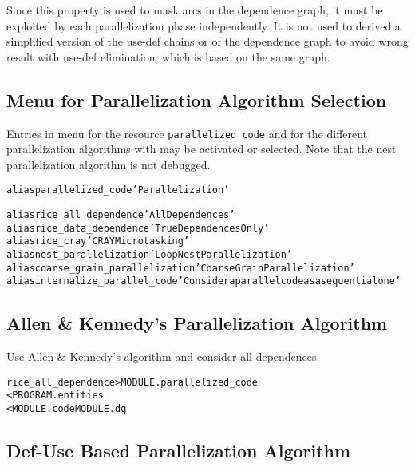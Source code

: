 \documentclass[a4paper]{report}
\newenvironment{PipsMake}{\begin{alltt}}{\end{alltt}}
\newenvironment{PipsPass}[1]{\label{pass:#1}}{}
\begin{document}
Since this property is used to mask arcs in the dependence graph, it
must be exploited by each parallelization phase independently. It is
not used to derived a simplified version of the use-def chains or of
the dependence graph to avoid wrong result with use-def elimination,
which is based on the same graph.


\subsection{Menu for Parallelization Algorithm Selection}

Entries in menu for the resource \verb/parallelized_code/ and for the
different parallelization algorithms with may be activated or
selected. Note that the nest parallelization algorithm is not debugged.

\begin{PipsMake}
alias parallelized_code 'Parallelization'

alias rice_all_dependence 'All Dependences'
alias rice_data_dependence 'True Dependences Only'
alias rice_cray 'CRAY Microtasking'
alias nest_parallelization 'Loop Nest Parallelization'
alias coarse_grain_parallelization 'Coarse Grain Parallelization'
alias internalize_parallel_code 'Consider a parallel code as a sequential one'
\end{PipsMake}


\subsection{Allen \& Kennedy's Parallelization Algorithm}
\label{subsubsection-allen-kennedy-parallelization-algorithm}

\begin{PipsPass}{rice_all_dependence}
Use A{\sc llen} \& K{\sc ennedy}'s algorithm and consider all
dependences.
\end{PipsPass}

\begin{PipsMake}
rice_all_dependence             > MODULE.parallelized_code
        < PROGRAM.entities
        < MODULE.code MODULE.dg
\end{PipsMake}


\subsection{Def-Use Based Parallelization Algorithm}
\end{document}

